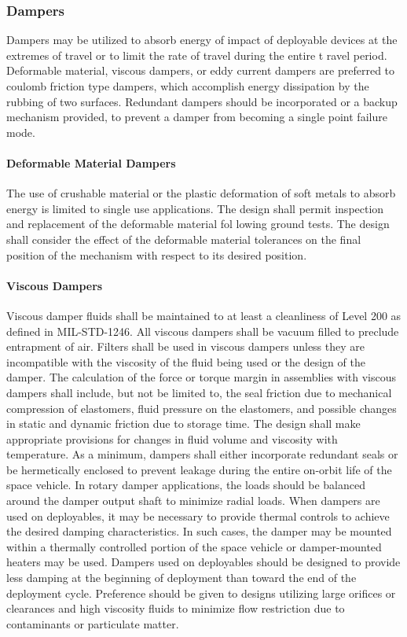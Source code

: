 \documentclass[12pt]{article}
\begin{document}
\subsubsection{Dampers} %
Dampers may be utilized to absorb energy of impact of deployable devices at the extremes of travel or to limit the rate of travel during the entire t ravel period.
Deformable material, viscous dampers, or eddy current dampers are preferred to coulomb friction type dampers, which accomplish energy dissipation by the rubbing of two surfaces. 
Redundant dampers should be incorporated or a backup mechanism provided, to prevent a damper from becoming a single point failure mode.

\paragraph{Deformable Material Dampers} %
The use of crushable material or the plastic deformation of soft metals to absorb energy is limited to single use applications. 
The design shall permit inspection and replacement of the deformable material fol lowing ground tests. 
The design shall consider the effect of the deformable material tolerances on the final position of the mechanism with respect to its desired position.

\paragraph{Viscous Dampers} %
Viscous damper fluids shall be maintained to at least a cleanliness of Level 200 as defined in MIL-STD-1246. 
All viscous dampers shall be vacuum filled to preclude entrapment of air. 
Filters shall be used in viscous dampers unless they are incompatible with the viscosity of the fluid being used or the design of the damper. 
The calculation of the force or torque margin in assemblies with viscous dampers shall include, but not be limited to, the seal friction due to mechanical compression of elastomers, fluid pressure on the elastomers, and possible changes in static and dynamic friction due to storage time. 
The design shall make appropriate provisions for changes in fluid volume and viscosity with temperature. 
As a minimum, dampers shall either incorporate redundant seals or be hermetically enclosed to prevent leakage during the entire on-orbit life of the space vehicle. 
In rotary damper applications, the loads should be balanced around the damper output shaft to minimize radial loads. 
When dampers are used on deployables, it may be necessary to provide thermal controls to achieve the desired damping characteristics. 
In such cases, the damper may be mounted within a thermally controlled portion of the space vehicle or damper-mounted heaters may be used. 
Dampers used on deployables should be designed to provide less damping at the beginning of deployment than toward the end of the deployment cycle. 
Preference should be given to designs utilizing large orifices or clearances and high viscosity fluids to minimize flow restriction due to contaminants or particulate matter.
\end{document}

